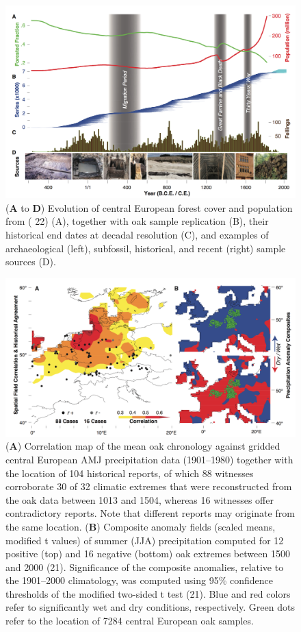 \documentclass[10pt,a4paper,twoside,onecolumn]{article}
\begin{document}
\begin{myfont}
\begin{multicols}{3}
\begin{figure}[h]
\includegraphics[width=1\textwidth]{BuntgenFig2}
\caption{(\textbf{A} to \textbf{D}) Evolution of central European forest cover and population from ( 22) (A), together with oak sample replication (B), their historical end dates at decadal resolution (C), and examples of archaeological (left), subfossil, historical, and recent (right) sample sources (D).} 
\label{Fig2} 
\end{figure}

\begin{figure}[h]
\includegraphics[width=1\textwidth]{BuntgenFig3}
\caption{(\textbf{A}) Correlation map of the mean oak chronology against gridded central European AMJ precipitation data (1901–1980) together with the location of 104 historical reports, of which 88 witnesses corroborate 30 of 32 climatic extremes that were reconstructed from the oak data between 1013 and 1504, whereas 16 witnesses offer contradictory reports. Note that different reports may originate from the same location. (\textbf{B}) Composite anomaly fields (scaled means, modified t values) of summer (JJA) precipitation computed for 12 positive (top) and 16 negative (bottom) oak extremes between 1500 and 2000 (21). Significance of the composite anomalies, relative to the 1901–2000 climatology, was computed using 95\% confidence thresholds of the modified two-sided t test (21). Blue and red colors refer to significantly wet and dry conditions, respectively. Green dots refer to the location of 7284 central European oak samples.} 
\label{Fig3} 
\end{figure}


\end{multicols}
\end{myfont}
\end{document}
